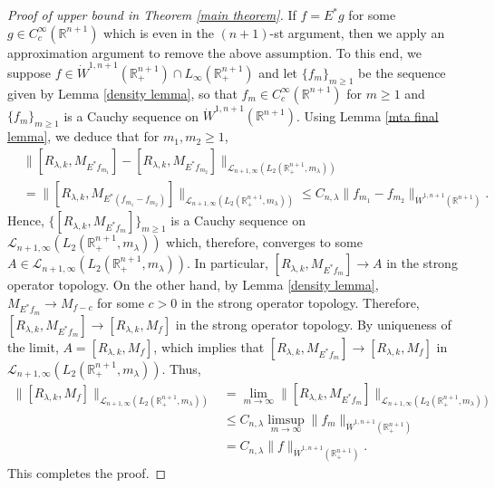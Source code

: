 \documentclass[12pt]{amsart}
\begin{document}
\begin{proof}[Proof of upper bound in Theorem \ref{main theorem}] If $f=E^{\ast}g$ for some $g\in C_c^\infty(\mathbb{R}^{n+1})$ which is even in the $(n+1)$-st {\color{blue}argument, then we} apply an approximation argument to remove the above assumption. To this end, we suppose $f\in  \dot{W}^{1,n+1}(\mathbb{R}_+^{n+1})\cap L_{\infty}(\mathbb{R}_+^{n+1})$ and let $\{f_m\}_{m\geq 1}$ be the sequence given by Lemma \ref{density lemma}, so that $f_m\in C_c^\infty(\mathbb{R}^{n+1})$ for $m\geq 1$ and $\{f_m\}_{m\geq 1}$ is a Cauchy sequence on $\dot{W}^{1,n+1}(\mathbb{R}^{n+1})$. Using Lemma \ref{mta final lemma}, we deduce that for $m_1,m_2\geq1$,
\begin{align*}
&\|[R_{\lambda,k},M_{E^{\ast}f_{m_1}}]-[R_{\lambda,k},M_{E^{\ast}f_{m_2}}]\|_{\mathcal{L}_{n+1,\infty}(L_2(\mathbb{R}^{n+1}_+,m_{\lambda}))}\\
&=\|[R_{\lambda,k},M_{E^{\ast}(f_{m_1}-f_{m_2})}]\|_{\mathcal{L}_{n+1,\infty}(L_2(\mathbb{R}^{n+1}_+,m_{\lambda}))}\leq C_{n,\lambda}\|f_{m_1}-f_{m_2}\|_{\dot{W}^{1,n+1}(\mathbb{R}^{n+1})}.
\end{align*}
Hence, $\{[R_{\lambda,k},M_{E^{\ast}f_{m}}]\}_{m\geq 1}$ is a Cauchy sequence on $\mathcal{L}_{n+1,\infty}(L_2(\mathbb{R}^{n+1}_+,m_{\lambda}))$ which, therefore, converges to some $A\in \mathcal{L}_{n+1,\infty}(L_2(\mathbb{R}^{n+1}_+,m_{\lambda})).$ In particular, $[R_{\lambda,k},M_{E^{\ast}f_{m}}]\rightarrow A$
in the strong operator topology. On the other hand, by Lemma \ref{density lemma}, $M_{E^{\ast}f_m}\rightarrow M_{f-c}$ for some $c>0$ in the strong operator topology. Therefore, $[R_{\lambda,k},M_{E^{\ast}f_m}]\rightarrow [R_{\lambda,k},M_f]$
in the strong operator topology. By uniqueness of the limit, $A=[R_{\lambda,k},M_f]$, which implies that  $[R_{\lambda,k},M_{E^{\ast}f_m}]\rightarrow [R_{\lambda,k},M_f]$
in $\mathcal{L}_{n+1,\infty}(L_2(\mathbb{R}^{n+1}_+,m_{\lambda})).$ Thus,
\begin{align*}
\|[R_{\lambda,k},M_f]\|_{\mathcal{L}_{n+1,\infty}(L_2(\mathbb{R}^{n+1}_+,m_{\lambda}))}&=\lim_{m\rightarrow \infty}\|[R_{\lambda,k},M_{E^{\ast}f_m}]\|_{\mathcal{L}_{n+1,\infty}(L_2(\mathbb{R}^{n+1}_+,m_{\lambda}))}\\
&\leq C_{n,\lambda}\limsup_{m\rightarrow \infty}\|f_m\|_{\dot{W}^{1,n+1}(\mathbb{R}_+^{n+1})}\\
&=C_{n,\lambda}\|f\|_{\dot{W}^{1,n+1}(\mathbb{R}_+^{n+1})}.
\end{align*}
This completes the proof.
\end{proof}
\end{document}
